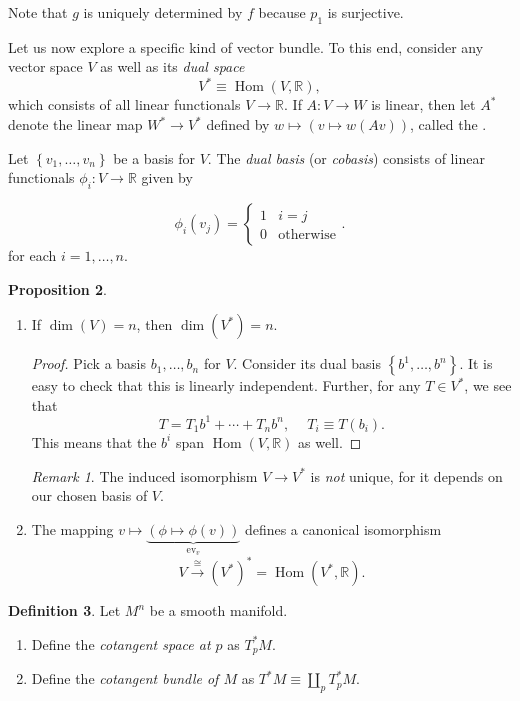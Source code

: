 \documentclass[10pt,letterpaper,cm]{nupset}
\theoremstyle{definition}
\newtheorem{definition}{Definition}[subsection]
\theoremstyle{theorem}
\newtheorem{prop}[definition]{Proposition}
\theoremstyle{remark}
\newtheorem{remark}[definition]{Remark}
\newcommand{\R}{\mathbb R}
\newcommand{\1}{\mathbf{1}}
\newcommand{\0}{\vec 0}
\DeclareMathOperator{\Hom}{Hom}
\DeclareMathOperator{\ev}{ev}
\begin{document}
Note that $g$ is uniquely determined by $f$ because $p_1$ is surjective. 

\bigskip

Let us now explore a specific kind of vector bundle. To this end, consider any   vector space $V$ as well as its \textit{dual space} $$V^{\ast} \equiv \Hom(V, \R),$$ which consists of all linear functionals $V \to \R$.
If $A : V \to W$ is linear, then let $A^{\ast}$ denote the linear map  $W^{\ast} \to V^{\ast}$ defined by $w \mapsto \left(v \mapsto w(Av)\right)$, called the .

\smallskip

Let $\left\{v_1, \ldots, v_n\right\}$ be a basis for $V$. The \textit{dual basis} (or \textit{cobasis}) consists of linear functionals $\phi_i : V \to \R$ given by 

\[ \phi_i(v_j) =
\begin{cases}
1 & i = j
\\  0 & \text{otherwise}
\end{cases}.
\] for each $i=1, \ldots, n$.

\begin{prop} $ $ 
\begin{enumerate}[label=(\arabic*)]
\item If $\dim(V) =n$, then $\dim(V^{\ast}) = n$.
\begin{proof} 
 Pick a basis $b_1, \ldots, b_n$ for $V$. Consider its dual basis $\left\{b^1, \ldots, b^n\right\}$. It is easy to check that this is linearly independent. Further, for any $T\in V^{\ast}$, we see that 
\[
T = T_1b^1 + \cdots + T_nb^n, \ \quad T_i \equiv T(b_i).
\] This means that the $b^i$ span $\Hom(V, \R)$ as well.
\end{proof}
\begin{remark}
The induced isomorphism $V \to V^{\ast}$ is \emph{not} unique, for it depends on our chosen basis of $V$.
\end{remark}
\item The mapping $v \mapsto \underbrace{\left(\phi \mapsto \phi(v)\right)}_{\ev_v}$ defines a canonical isomorphism $$V \overset{\cong}{\longrightarrow} \left(V^{\ast}\right)^{\ast} = \Hom(V^{\ast}, \R).$$
\end{enumerate}
\end{prop}


\begin{definition} 
Let $M^n$ be a smooth manifold.
\begin{enumerate}
\item Define the \textit{cotangent space at $p$} as $T_p^{\ast}M$. 
\item Define the \textit{cotangent bundle of $M$} as $T^{\ast}M \equiv \coprod_p T_p^{\ast}M$.
\end{enumerate}
\end{definition}
\end{document}
